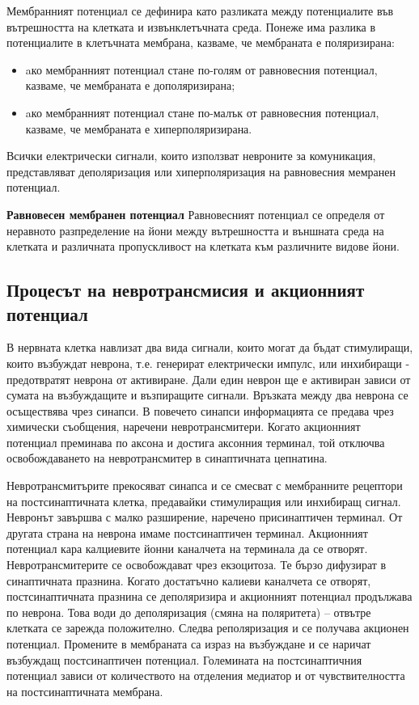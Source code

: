 \documentclass{article}
\numberwithin{equation}{section}
\begin{document}
\vspace{5mm} %

Мембранният потенциал се дефинира като разликата между потенциалите във вътрешността на клетката и извънклетъчната среда.
Понеже има разлика в потенциалите в клетъчната мембрана, казваме, че мембраната е поляризирана:
\begin{itemize}
  \item aко мембранният потенциал стане по-голям от равновесния потенциал, казваме, че мембраната е дополяризирана;
  \item aко мембранният потенциал стане по-малък от равновесния потенциал, казваме, че мембраната е хиперполяризирана.
\end{itemize}

Всички електрически сигнали, които използват невроните за комуникация, представляват деполяризация или хиперполяризация на равновесния мемранен потенциал.

\vspace{5mm} %
\textbf{Равновесен мембранен потенциал}
Равновесният потенциал се определя от неравното разпределение на йони между вътрешността и външната среда на клетката и различната пропускливост на клетката към различните видове йони.


\vspace{5mm} %
\subsection{Процесът на невротрансмисия и акционният потенциал}
В нервната клетка навлизат два вида сигнали, които могат да бъдат стимулиращи, които възбуждат неврона, т.е. генерират електрически импулс,
или инхибиращи - предотвратят неврона от активиране.  Дали един неврон ще е активиран зависи от сумата на възбуждащите и възпиращите
сигнали.  Връзката между два неврона се осъществява чрез синапси. В повечето синапси информацията се предава чрез химически съобщения,
наречени невротрансмитери. Когато акционният потенциал преминава по аксона и достига аксонния терминал, той отключва освобождаването на
невротрансмитер в синаптичната цепнатина.

Невротрансмитърите прекосяват синапса и се смесват с мембранните рецептори на постсинаптичната клетка, предавайки стимулиращия или инхибиращ
сигнал. Невронът завършва с малко разширение, наречено присинаптичен терминал. От другата страна на неврона имаме постсинаптичен терминал.
Акционният потенциал кара калциевите йонни каналчета на терминала да се отворят. Невротрансмитерите се освобождават чрез екзоцитоза. Те
бързо дифузират в синаптичната празнина. Когато достатъчно калиеви каналчета се отворят, постсинаптичната празнина се деполяризира и
акционният потенциал продължава по неврона. Това води до деполяризация (смяна на поляритета) -- отвътре клетката се зарежда положително.
Следва реполяризация и се получава акционен потенциал. Промените в мембраната  са израз на възбуждане и се наричат възбуждащ постсинаптичен
потенциал. Големината на постсинаптичния потенциал зависи от количеството на отделения медиатор и от чувствителността на постсинаптичната
мембрана.
\end{document}
